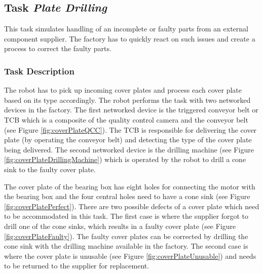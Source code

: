 

\subsection{Task \emph{Plate Drilling}}
\label{ssec:TaskPlateDrilling}



This task simulates handling of an incomplete or faulty parts from an external component supplier. The factory has to quickly react on such issues and create a process to correct the faulty parts.

\subsubsection{Task Description}
\label{sssec:TaskPlateDrillingDescription}
The robot has to pick up incoming cover plates and process each cover plate based on its type accordingly.
The robot performs the task with two networked devices in the factory.
The first networked device is the triggered conveyor belt or TCB which is a composite of the quality control camera and the conveyor belt (see Figure \ref{fig:coverPlateQCC}).
The TCB is responsible for delivering the cover plate (by operating the conveyor belt) and detecting the type of the cover plate being delivered.
The second networked device is the drilling machine (see Figure \ref{fig:coverPlateDrillingMachine}) which is operated by the robot to drill a cone sink to the faulty cover plate.

The cover plate of the bearing box has eight holes for connecting the motor with the bearing box and the four central holes need to have a cone sink (see Figure \ref{fig:coverPlatePerfect}). 
There are two possible defects of a cover plate which need to be accommodated in this task.
The first case is where the supplier forgot to drill one of the cone sinks, which results in a faulty cover plate (see Figure \ref{fig:coverPlateFaulty}). 
The faulty cover plates can be corrected by drilling the cone sink with the drilling machine available in the factory.
The second case is where the cover plate is unusable (see Figure \ref{fig:coverPlateUnusable}) and needs to be returned to the supplier for replacement.\\

